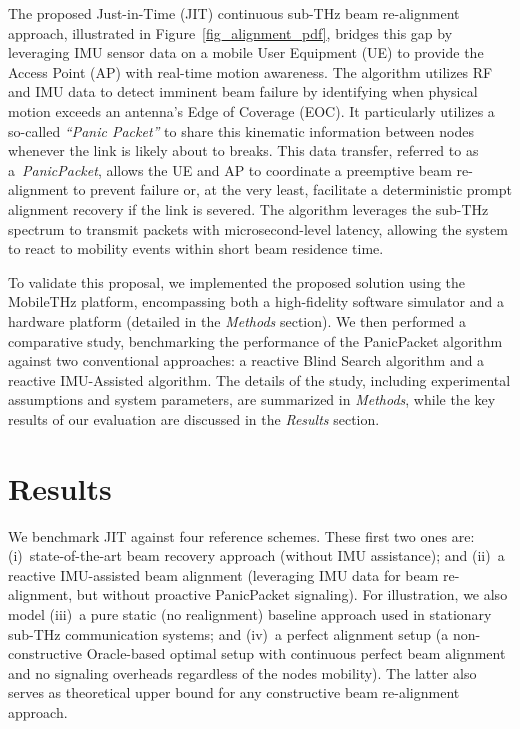 \documentclass[fleqn,10pt]{wlscirep}
\begin{document}
The proposed Just-in-Time (JIT) continuous sub-THz beam re-alignment approach, illustrated in Figure~\ref{fig_alignment_pdf}, bridges this gap by leveraging IMU sensor data on a mobile User Equipment (UE) to provide the Access Point (AP) with real-time motion awareness. The algorithm utilizes RF and IMU data to detect imminent beam failure by identifying when physical motion exceeds an antenna's Edge of Coverage (EOC). It particularly utilizes a so-called \emph{``Panic Packet''} to share this kinematic information between nodes whenever the link is likely about to breaks. This data transfer, referred to as a~\emph{PanicPacket}, allows the UE and AP to coordinate a preemptive beam re-alignment to prevent failure or, at the very least, facilitate a deterministic prompt alignment recovery if the link is severed. The algorithm leverages the sub-THz spectrum to transmit packets with microsecond-level latency, allowing the system to react to mobility events within short beam residence time.

To validate this proposal, we implemented the proposed solution using the MobileTHz platform, encompassing both a high-fidelity software simulator and a hardware platform (detailed in the \textit{Methods} section). We then performed a comparative study, benchmarking the performance of the PanicPacket algorithm against two conventional approaches: a reactive Blind Search algorithm and a reactive IMU-Assisted algorithm. The details of the study, including experimental assumptions and system parameters, are summarized in \textit{Methods}, while the key results of our evaluation are discussed in the \textit{Results} section.


\section*{Results}

We benchmark JIT against four reference schemes. These first two ones are: (i)~state-of-the-art beam recovery approach (without IMU assistance); and (ii)~a reactive IMU-assisted beam alignment (leveraging IMU data for beam re-alignment, but without proactive PanicPacket signaling). For illustration, we also model (iii)~a pure static (no realignment) baseline approach used in stationary sub-THz communication systems; and (iv)~a perfect alignment setup (a non-constructive Oracle-based optimal setup with continuous perfect beam alignment and no signaling overheads regardless of the nodes mobility). The latter also serves as theoretical upper bound for any constructive beam re-alignment approach.
\end{document}
